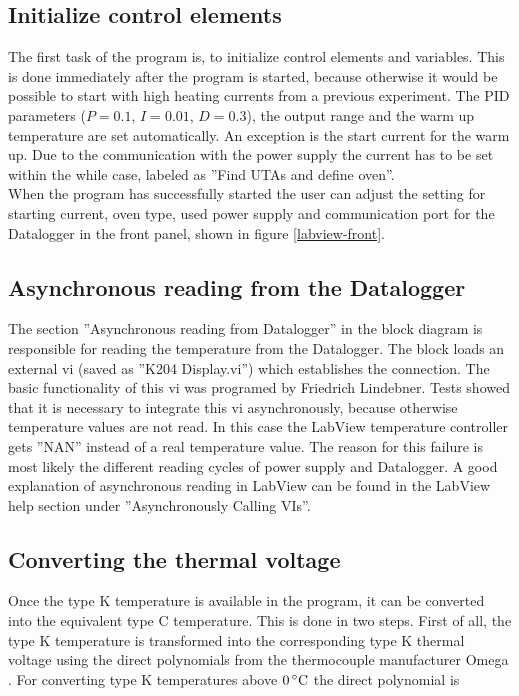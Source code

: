 \documentclass[parskip,12pt,headsepline,a4paper] {scrbook}
\begin{document}
\subsection{Initialize control elements}
\vspace{-1\baselineskip}
The first task of the program is, to initialize control elements and variables. This is done immediately after the program is started, because otherwise it would be possible to start with high heating currents from a previous experiment. The PID parameters ($P = 0.1$, $I = 0.01$, $D = 0.3$), the output range and the warm up temperature are set automatically. An exception is the start current for the warm up. Due to the communication with the power supply the current has to be set within the while case, labeled as ''Find UTAs and define oven''. \\
When the program has successfully started the user can adjust the setting for starting current, oven type, used power supply and communication port for the Datalogger in the front panel, shown in figure \ref{labview-front}.


\subsection{Asynchronous reading from the Datalogger}
\vspace{-1\baselineskip}
The section ''Asynchronous reading from Datalogger'' in the block diagram is responsible for reading the temperature from the Datalogger. The block loads an external vi (saved as ''K204 Display.vi'') which establishes the connection. The basic functionality of this vi was programed by Friedrich Lindebner. Tests showed that it is necessary to integrate this vi asynchronously, because otherwise temperature values are not read. In this case the LabView temperature controller gets ''NAN'' instead of a real temperature value. The reason for this failure is most likely the different reading cycles of power supply and Datalogger. A good explanation of asynchronous reading in LabView can be found in the LabView help section under ''Asynchronously Calling VIs''.

\subsection{Converting the thermal voltage}
\vspace{-1\baselineskip}
Once the type K temperature is available in the program, it can be converted into the equivalent type C temperature. This is done in two steps. First of all, the type K temperature is transformed into the corresponding type K thermal voltage using the direct polynomials from the thermocouple manufacturer Omega \cite{omega-polynomials}. For converting type K temperatures above $\unit[0]{^\circ C}$ the direct polynomial is
\end{document}
